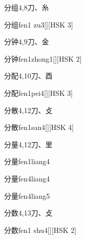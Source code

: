 \begin{entry}{分组}{4,8}{⼑、⽷}
  \begin{phonetics}{分组}{fen1 zu3}[][HSK 3]
  \end{phonetics}
\end{entry}

\begin{entry}{分钟}{4,9}{⼑、⾦}
  \begin{phonetics}{分钟}{fen1zhong1}[][HSK 2]
  \end{phonetics}
\end{entry}

\begin{entry}{分配}{4,10}{⼑、⾣}
  \begin{phonetics}{分配}{fen1pei4}[][HSK 3]
  \end{phonetics}
\end{entry}

\begin{entry}{分散}{4,12}{⼑、⽁}
  \begin{phonetics}{分散}{fen1san4}[][HSK 4]
  \end{phonetics}
\end{entry}

\begin{entry}{分量}{4,12}{⼑、⾥}
  \begin{phonetics}{分量}{fen1liang4}
  \end{phonetics}
  \begin{phonetics}{分量}{fen4liang4}
  \end{phonetics}
  \begin{phonetics}{分量}{fen4liang5}
  \end{phonetics}
\end{entry}

\begin{entry}{分数}{4,13}{⼑、⽁}
  \begin{phonetics}{分数}{fen1 shu4}[][HSK 2]
  \end{phonetics}
\end{entry}

